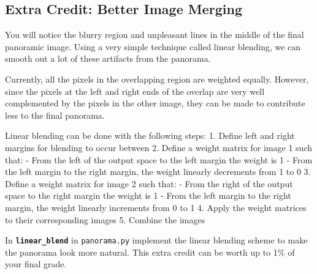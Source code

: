 \documentclass[11pt]{article}
\begin{document}
    \hypertarget{extra-credit-better-image-merging}{%
\subsection{Extra Credit: Better Image
Merging}\label{extra-credit-better-image-merging}}

You will notice the blurry region and unpleasant lines in the middle of
the final panoramic image. Using a very simple technique called linear
blending, we can smooth out a lot of these artifacts from the panorama.

Currently, all the pixels in the overlapping region are weighted
equally. However, since the pixels at the left and right ends of the
overlap are very well complemented by the pixels in the other image,
they can be made to contribute less to the final panorama.

Linear blending can be done with the following steps: 1. Define left and
right margins for blending to occur between 2. Define a weight matrix
for image 1 such that: - From the left of the output space to the left
margin the weight is 1 - From the left margin to the right margin, the
weight linearly decrements from 1 to 0 3. Define a weight matrix for
image 2 such that: - From the right of the output space to the right
margin the weight is 1 - From the left margin to the right margin, the
weight linearly increments from 0 to 1 4. Apply the weight matrices to
their corresponding images 5. Combine the images

In \textbf{\texttt{linear\_blend}} in \texttt{panorama.py} implement the
linear blending scheme to make the panorama look more natural. This
extra credit can be worth up to 1\% of your final grade.
\end{document}
